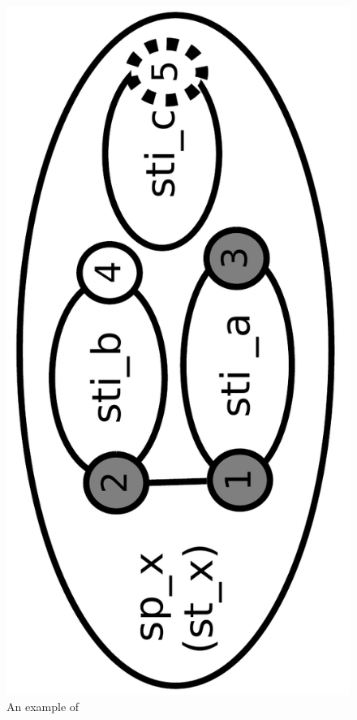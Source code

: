 \begin{figure}[htb]
  \begin{center}
    \includegraphics[angle=-90, scale=0.18]{./figs/diagram_OutwardBindingSite.pdf}
    \caption{An example of \OutwardBindingSite}
    \label{fig:OutwardBindingSiteExample}
  \end{center}
\end{figure}

